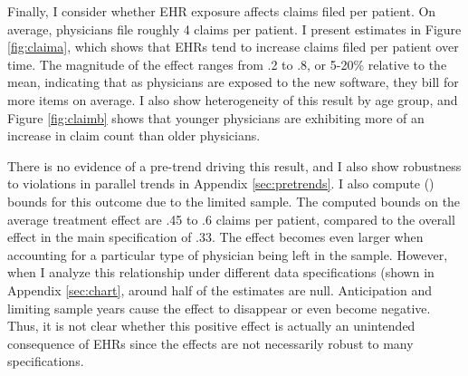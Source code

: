 \documentclass[12pt]{article}
\begin{document}
Finally, I consider whether EHR exposure affects claims filed per patient. On average, physicians file roughly 4 claims per patient. I present estimates in Figure \ref{fig:claima}, which shows that EHRs tend to increase claims filed per patient over time. The magnitude of the effect ranges from .2 to .8, or 5-20\% relative to the mean, indicating that as physicians are exposed to the new software, they bill for more items on average.  I also show heterogeneity of this result by age group, and Figure \ref{fig:claimb} shows that younger physicians are exhibiting more of an increase in claim count than older physicians.

There is no evidence of a pre-trend driving this result, and I also show robustness to violations in parallel trends in Appendix \ref{sec:pretrends}. I also compute \citeauthor{lee2009training} (\citeyear{lee2009training}) bounds for this outcome due to the limited sample. The computed bounds on the average treatment effect are .45 to .6 claims per patient, compared to the overall effect in the main specification of .33. The effect becomes even larger when accounting for a particular type of physician being left in the sample. However, when I analyze this relationship under different data specifications (shown in Appendix \ref{sec:chart}, around half of the estimates are null. Anticipation and limiting sample years cause the effect to disappear or even become negative. Thus, it is not clear whether this positive effect is actually an unintended consequence of EHRs since the effects are not necessarily robust to many specifications. 
     
\end{document}
